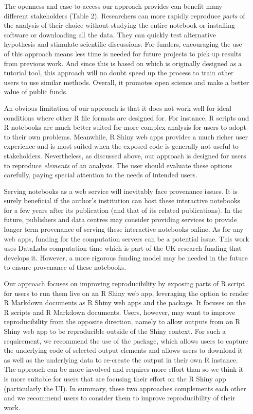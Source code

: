 The openness and ease-to-access our approach provides can benefit many
different stakeholders (Table 2). Researchers can more rapidly reproduce
\textit{parts} of the analysis of their choice without studying the
entire notebook or installing software or downloading all the data. They
can quickly test alternative hypothesis and stimulate scientific
discussions. For funders, encouraging the use of this approach means
less time is needed for future projects to pick up results from previous
work. And since this is based on  which is originally
designed as a tutorial tool, this approach will no doubt speed up the
process to train other users to use similar methods. Overall, it
promotes open science and make a better value of public funds.

An obvious limitation of our approach is that it does not work well for
ideal conditions where other R file formats are designed for. For
instance, R scripts and R notebooks are much better suited for more
complex analysis for users to adopt to their own problems. Meanwhile, R
Shiny web apps provides a much richer user experience and is most suited
when the exposed code is generally not useful to stakeholders.
Nevertheless, as discussed above, our approach is designed for users to
reproduce \textit{elements} of an analysis. The user should evaluate
these options carefully, paying special attention to the needs of
intended users.

Serving notebooks as a web service will inevitably face provenance
issues. It is surely beneficial if the author's institution can host
these interactive notebooks for a few years after its publication (and
that of its related publications). In the future, publishers and data
centres may consider providing services to provide longer term
provenance of serving these interactive notebooks online. As for any web
apps, funding for the computation servers can be a potential issue. This
work uses DataLabs computation time which is part of the UK research
funding that develops it. However, a more rigorous funding model may be
needed in the future to ensure provenance of these notebooks.

Our approach focuses on improving reproducibility by exposing parts of R
script for users to run them live on an R Shiny web app, leveraging the
option to render R Markdown documents as R Shiny web apps and the
 package. It focuses on the R scripts and R Markdown
documents. Users, however, may want to improve reproducibility from the
opposite direction, namely to allow outputs from an R Shiny web app to
be reproducible outside of the Shiny context. For such a requirement, we
recommend the use of the  \citep{shinymeta} package,
which allows users to capture the underlying code of selected output
elements and allows users to download it as well as the underlying data
to re-create the output in their own R instance. The 
approach can be more involved and requires more effort than 
so we think it is more suitable for users that are focusing their effort
on the R Shiny app (particularly the UI). In summary, these two
approaches complements each other and we recommend users to consider
them to improve reproducibility of their work.

